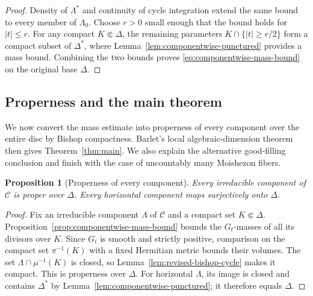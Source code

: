 \documentclass[11pt]{amsart}
\numberwithin{equation}{section}
\theoremstyle{plain}
\newtheorem{prop}[thm]{Proposition}
\theoremstyle{definition}
\begin{document}
\begin{proof}
Density of $\Lambda^*$ and continuity of cycle integration extend
the same bound to every member of $\Lambda_0$.  Choose $r>0$ small
enough that the bound holds for $|t|\le r$.  For any compact
$K\Subset\Delta$, the remaining parameters
$K\cap\{|t|\ge r/2\}$ form a compact subset of $\Delta^*$,
where Lemma~\ref{lem:componentwise-punctured} provides a mass bound.  Combining the
two bounds proves \eqref{eq:componentwise-mass-bound} on the original
base $\Delta$.
\end{proof}

\subsection{Properness and the main theorem}
\label{ss:componentwise-conclusion}

We now convert the mass estimate into properness of every component
over the entire disc by Bishop compactness.  Barlet's local
algebraic-dimension theorem then gives Theorem~\ref{thm:main}.
We also explain the alternative good-filling conclusion and finish
with the case of uncountably many Moishezon fibers.

\begin{prop}[Properness of every component]
\label{prop:componentwise-proper-main}
Every irreducible component of $\mathscr C$ is proper over $\Delta$.
Every horizontal component maps surjectively onto $\Delta$.
\end{prop}

\begin{proof}
Fix an irreducible component $\Lambda$ of $\mathscr C$ and a compact set
$K\Subset\Delta$.  Proposition~\ref{prop:componentwise-mass-bound}
bounds the $G_t$-masses of all its divisors over $K$.  Since $G_t$ is
smooth and strictly positive, comparison on the compact set
$\pi^{-1}(K)$ with a fixed Hermitian metric bounds their volumes.
The set $\Lambda\cap\mu^{-1}(K)$ is closed, so
Lemma~\ref{lem:revised-bishop-cycle} makes it compact.  This is properness
over $\Delta$.  For horizontal $\Lambda$, its image is closed and
contains $\Delta^*$ by Lemma~\ref{lem:componentwise-punctured};
it therefore equals $\Delta$.
\end{proof}
\end{document}
